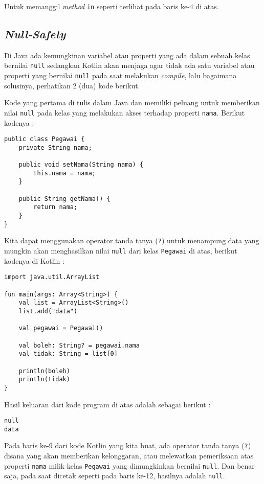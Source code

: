 Untuk memanggil \textit{method} \texttt{in} seperti terlihat pada baris ke-4 di atas.

\subsection{\textit{Null-Safety}}

Di Java ada kemungkinan variabel atau properti yang ada dalam sebuah kelas bernilai \texttt{null} sedangkan Kotlin akan menjaga agar tidak ada satu variabel atau properti yang bernilai \texttt{null} pada saat melakukan \textit{compile}, lalu bagaimana solusinya, perhatikan 2 (dua) kode berikut.

Kode yang pertama di tulis dalam Java dan memiliki peluang untuk memberikan nilai \texttt{null} pada kelas yang melakukan akses terhadap properti \texttt{nama}. Berikut kodenya :

\begin{lstlisting}
public class Pegawai {
	private String nama;
	
	public void setNama(String nama) {
		this.nama = nama;
	}
	
	public String getNama() {
		return nama;
	}
}
\end{lstlisting}

Kita dapat menggunakan operator tanda tanya (\texttt{?}) untuk menampung data yang mungkin akan menghasilkan nilai \texttt{null} dari kelas \texttt{Pegawai} di atas, berikut kodenya di Kotlin :

\begin{lstlisting}
import java.util.ArrayList

fun main(args: Array<String>) {
	val list = ArrayList<String>()
	list.add("data")
	
	val pegawai = Pegawai()
	
	val boleh: String? = pegawai.nama
	val tidak: String = list[0]
	
	println(boleh)
	println(tidak)
}
\end{lstlisting}

Hasil keluaran dari kode program di atas adalah sebagai berikut :

\begin{lstlisting}
null
data
\end{lstlisting}

Pada baris ke-9 dari kode Kotlin yang kita buat, ada operator tanda tanya (\texttt{?}) disana yang akan memberikan kelonggaran, atau melewatkan pemeriksaan atas properti \texttt{nama} milik kelas \texttt{Pegawai} yang dimungkinkan bernilai \texttt{null}. Dan benar saja, pada saat dicetak seperti pada baris ke-12, hasilnya adalah \texttt{null}.

